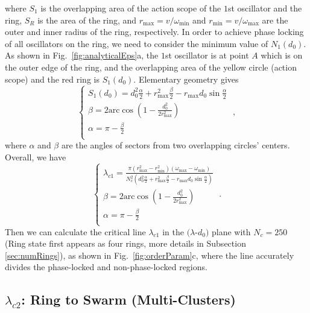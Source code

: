 \documentclass[%
 aip,
 amsmath,amssymb,
 reprint,%
]{revtex4-1}
\begin{document}
where $S_1$ is the overlapping area of the action scope of the $1$st oscillator and the ring, $S_R$ is the area of the ring, and $r_{\max}=v/\omega_{\min}$ and $r_{\min}=v/\omega_{\max}$ are the outer and inner radius of the ring, respectively. In order to achieve phase locking of all oscillators on the ring, we need to consider the minimum value of $N_1\left( d_0\right)$. As shown in Fig.~\ref{fig:analyticalEps}a, the $1$st oscillator is at point $A$ which is on the outer edge of the ring, and the overlapping area of the yellow circle (action scope) and the red ring is $S_1\left( d_0 \right)$.  Elementary geometry gives 
\begin{equation}\label{eq:S1}
    \begin{cases}
        S_1\left( d_0 \right) =d_{0}^{2}\frac{\alpha}{2}+r_{\max}^{2}\frac{\beta}{2}-r_{\max}d_0\sin \frac{\alpha}{2}\\
        \beta =2\mathrm{arc}\cos \left( 1-\frac{d_{0}^{2}}{2r_{\max}^{2}} \right)\\
        \alpha =\pi -\frac{\beta}{2}\\
    \end{cases}\;,
\end{equation}
where $\alpha$ and $\beta$ are the angles of sectors from two overlapping circles' centers. Overall, we have
\begin{equation}
    \begin{cases}
        \lambda _{c1}=\frac{\pi \left( r_{\max}^{2}-r_{\min}^{2} \right) \left( \omega _{\max}-\omega _{\min} \right)}{N_{c}^{2}\left( d_{0}^{2}\frac{\alpha}{2}+r_{\max}^{2}\frac{\beta}{2}-r_{\max}d_0\sin \frac{\alpha}{2} \right)}\\
        \beta =2\mathrm{arc}\cos \left( 1-\frac{d_{0}^{2}}{2r_{\max}^{2}} \right)\\
        \alpha =\pi -\frac{\beta}{2}\\
    \end{cases}\;.
\end{equation}
Then we can calculate the critical line $\lambda_{c1}$ in the $(\lambda$-$d_0)$ plane with $N_c=250$ (Ring state first appears as four rings, more details in Subsection \ref{sec:numRings}), as shown in Fig.~\ref{fig:orderParam}c, where the line accurately divides the phase-locked and non-phase-locked regions.

\subsection{$\lambda_{c2}$: Ring to Swarm (Multi-Clusters)}
\end{document}
